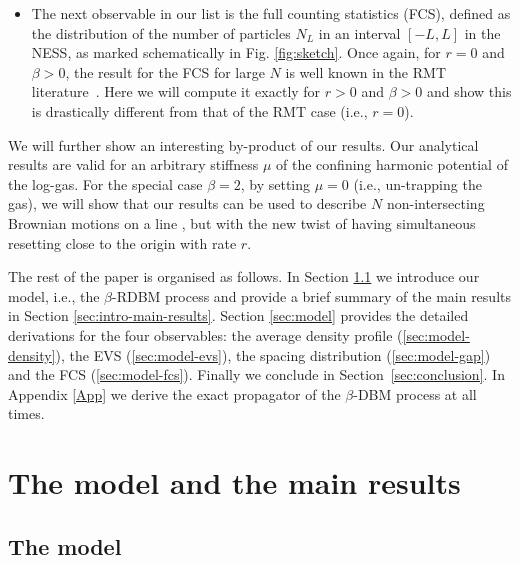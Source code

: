 \documentclass[onecolumn,superscriptaddress,
 amsmath,amssymb,
 aps,
 prd,
]{revtex4-1}
\begin{document}
\begin{itemize}
\item The next observable in our list is the full counting statistics (FCS), defined as the distribution of the number of particles $N_L$ in an interval $[-L,L]$ 
in the NESS, as marked schematically in Fig. \ref{fig:sketch}. Once again, for $r=0$ and $\beta >0$, the result for the FCS for large $N$ is well known in the RMT literature~\cite{DM63,CL95,FS95,MMSV14,CLM15,MMSV16}. Here we will compute it exactly for $r>0$ and $\beta > 0$ and show this is drastically different from that of the RMT case (i.e., $r=0$). 

\end{itemize}

We will further show an interesting by-product of our results. Our analytical results are valid for an arbitrary stiffness $\mu$ of the confining harmonic potential of the log-gas. For the special case $\beta = 2$, by setting $\mu = 0$ (i.e., un-trapping the gas), we will show that our results can be used to describe $N$ non-intersecting Brownian motions on a line \cite{M1984,SMCR08,Bor09,RS11,GMS21}, but with the new twist of having simultaneous resetting close to the origin with rate $r$. 



\vspace{0.1cm}
%
The rest of the paper is organised as follows. In Section \ref{sec:intro-model} we introduce our model, i.e., the $\beta$-RDBM process
and provide a brief summary of the main results in Section \ref{sec:intro-main-results}. Section \ref{sec:model} provides the detailed derivations for the four observables: the average density profile (\ref{sec:model-density}), the EVS (\ref{sec:model-evs}), the spacing distribution (\ref{sec:model-gap}) and the FCS (\ref{sec:model-fcs}). Finally we conclude in Section~\ref{sec:conclusion}. In Appendix \ref{App} we derive the exact propagator of the $\beta$-DBM process at all times. 



\section{The model and the main results}


\subsection{The model} \label{sec:intro-model}
\end{document}
